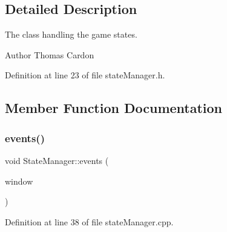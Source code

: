 \subsection{Detailed Description}
The class handling the game states. 

\begin{DoxyAuthor}{Author}
Thomas Cardon 
\end{DoxyAuthor}


Definition at line 23 of file state\+Manager.\+h.



\subsection{Member Function Documentation}
\mbox{\label{classns_game_1_1_state_manager_acc7933a4b2160d8058789e24c0bd3cc6}} 
\subsubsection{\texorpdfstring{events()}{events()}}
{\footnotesize\ttfamily void State\+Manager\+::events (\begin{DoxyParamCaption}\item[{Min\+GL \&}]{window }\end{DoxyParamCaption})}



Definition at line 38 of file state\+Manager.\+cpp.

